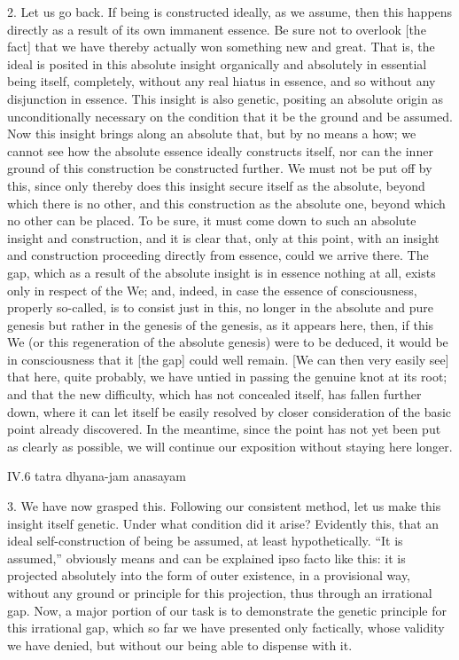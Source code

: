 2. Let us go back.
If being is constructed ideally, as we assume,
then this happens directly as
a result of its own immanent essence.
Be sure not to overlook [the fact] that we have thereby
actually won something new and great.
That is, the ideal is posited in this absolute insight
organically and absolutely in essential being itself,
completely, without any real hiatus in essence,
and so without any disjunction in essence.
This insight is also genetic,
positing an absolute origin as unconditionally necessary
on the condition that it be the ground and be assumed.
Now this insight brings along an absolute that,
but by no means a how; we cannot see how
the absolute essence ideally constructs itself,
nor can the inner ground of this construction be constructed further.
We must not be put off by this,
since only thereby does
this insight secure itself as the absolute,
beyond which there is no other,
and this construction as the absolute one,
beyond which no other can be placed.
To be sure, it must come down to such
an absolute insight and construction,
and it is clear that, only at this point,
with an insight and construction proceeding
directly from essence, could we arrive there.
The gap, which as a result of
the absolute insight is in essence nothing at all,
exists only in respect of the We;
and, indeed, in case the essence of consciousness,
properly so-called, is to consist just in this,
no longer in the absolute and pure genesis
but rather in the genesis of the genesis, as it appears here,
then, if this We (or this regeneration of the absolute genesis)
were to be deduced, it would be in consciousness
that it [the gap] could well remain.
[We can then very easily see] that here, quite probably,
we have untied in passing the genuine knot at its root;
and that the new difficulty,
which has not concealed itself,
has fallen further down,
where it can let itself
be easily resolved by closer consideration
of the basic point already discovered.
In the meantime, since the point has
not yet been put as clearly as possible,
we will continue our exposition without staying here longer.

IV.6
tatra dhyana-jam anasayam

3. We have now grasped this.
Following our consistent method,
let us make this insight itself genetic.
Under what condition did it arise?
Evidently this, that an ideal
self-construction of being be assumed,
at least hypothetically.
“It is assumed,” obviously means and
can be explained ipso facto like this:
it is projected absolutely
into the form of outer existence,
in a provisional way,
without any ground or principle
for this projection,
thus through an irrational gap.
Now, a major portion of our task is
to demonstrate the genetic principle
for this irrational gap,
which so far we have presented only factically,
whose validity we have denied,
but without our being able to dispense with it.

